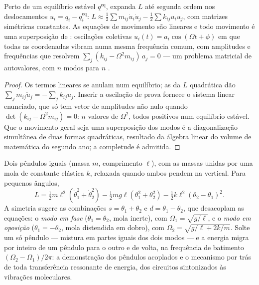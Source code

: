 \begin{proposition}\label{prop:b3:lagrangian-mechanics:modes}
Perto de um equilíbrio estável $q^{\text{eq}}$, expanda $L$ até
segunda ordem nos deslocamentos $u_i = q_i - q_i^{\text{eq}}$:
$L \approx \tfrac12\sum m_{ij}\dot u_i\dot u_j -
\tfrac12\sum k_{ij}u_iu_j$, com matrizes simétricas constantes. As
equações de movimento são lineares e todo movimento é uma superposição
de \emph{}: oscilações coletivas $u_i(t) = a_i\cos(\Omega t
+ \phi)$ em que todas as coordenadas vibram numa mesma frequência
comum, com amplitudes e frequências que resolvem $\sum_j(k_{ij} -
\Omega^2m_{ij})\,a_j = 0$ --- um problema matricial de autovalores, com
$n$ modos para $n$ .
\end{proposition}

\begin{proof}
Os termos lineares se anulam num equilíbrio; as  da $L$ quadrática dão
$\sum_jm_{ij}\ddot u_j = -\sum_jk_{ij}u_j$. Inserir a oscilação de
prova fornece o sistema linear enunciado, que só tem vetor de
amplitudes não nulo quando $\det(k_{ij} -
\Omega^2m_{ij}) = 0$: $n$ valores de $\Omega^2$, todos positivos num
equilíbrio estável. Que o movimento geral seja uma superposição dos
modos é a diagonalização simultânea de duas formas quadráticas,
resultado da álgebra linear do volume de matemática do segundo ano; a
completude é admitida.
\end{proof}

\begin{example}\label{ex:b3:lagrangian-mechanics:coupled}
Dois pêndulos iguais (massa $m$, comprimento $\ell$), com as massas
unidas por uma mola de constante elástica $k$, relaxada quando ambos
pendem na vertical. Para pequenos ângulos,
\[
L = \tfrac12 m\ell^2(\dot\theta_1^2 + \dot\theta_2^2)
 - \tfrac12 mg\ell(\theta_1^2 + \theta_2^2)
 - \tfrac12 k\ell^2(\theta_2 - \theta_1)^2 .
\]
A simetria sugere as combinações $s = \theta_1 + \theta_2$ e $d =
\theta_1 - \theta_2$, que desacoplam as equações: o \emph{modo em fase}
($\theta_1 = \theta_2$, mola inerte), com $\Omega_1 =
\sqrt{g/\ell}$, e o \emph{modo em oposição} ($\theta_1 = -\theta_2$,
mola distendida em dobro), com $\Omega_2 = \sqrt{g/\ell + 2k/m}$.
Solte um só pêndulo --- mistura em partes iguais dos dois modos --- e a
energia migra por inteiro de um pêndulo para o outro e de volta, na
frequência de batimento $(\Omega_2 - \Omega_1)/2\pi$: a demonstração
dos pêndulos acoplados e o mecanismo por trás de toda transferência
ressonante de energia, dos circuitos sintonizados às vibrações
moleculares.
\end{example}

